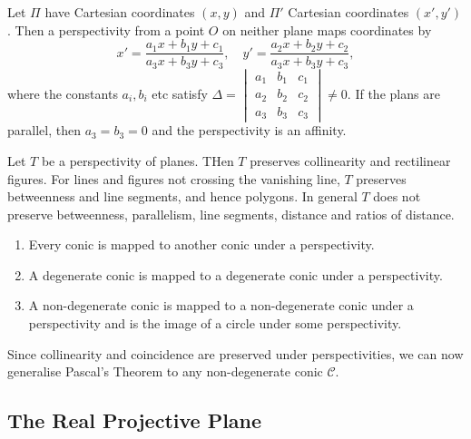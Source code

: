 \begin{theorem}
    Let \(\Pi\) have Cartesian coordinates \((x, y)\) and \(\Pi'\) Cartesian coordinates \((x', y')\). Then a perspectivity from a point \(O\) on neither plane maps coordinates by
    \[x' = \frac{a_1 x + b_1 y + c_1}{a_3 x + b_3 y + c_3}, \quad y' = \frac{a_2 x + b_2 y + c_2}{a_3 x + b_3 y + c_3},\]
    where the constants \(a_i, b_i\) etc satisfy \(\Delta = \begin{vmatrix}
        a_1 & b_1 & c_ 1 \\
        a_2 & b_2 & c_2  \\
        a_3 & b_3 & c_3
    \end{vmatrix} \neq 0\).
    If the plans are parallel, then \(a_3 = b_3 = 0\) and the perspectivity is an affinity.
\end{theorem}


\begin{theorem}
    Let \(T\) be a perspectivity of planes. THen \(T\) preserves collinearity and rectilinear figures. For lines and figures not crossing the vanishing line, \(T\) preserves betweenness and line segments, and hence polygons. In general \(T\) does not preserve betweenness, parallelism, line segments, distance and ratios of distance.
\end{theorem}

\begin{theorem}
    \begin{enumerate}[label=(\alph*)]
        \item Every conic is mapped to another conic under a perspectivity.
        \item A degenerate conic is mapped to a degenerate conic under a perspectivity.
        \item A non-degenerate conic is mapped to a non-degenerate conic under a perspectivity and is the image of a circle under some perspectivity.
    \end{enumerate}
\end{theorem}

Since collinearity and coincidence are preserved under perspectivities, we can now generalise Pascal's Theorem to any non-degenerate conic \(\mathcal{C}\). \\

\subsection{The Real Projective Plane}

